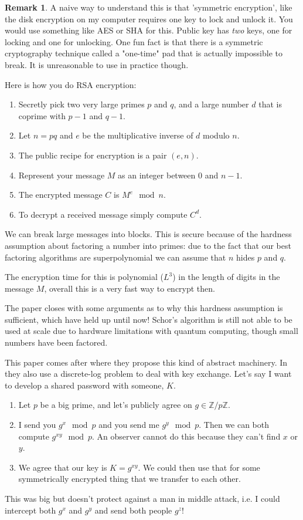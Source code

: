 \documentclass{amsart}
\theoremstyle{definition}
\newtheorem{remark}[theorem]{Remark}
\begin{document}
\begin{remark}

A naive way to understand this is that 'symmetric encryption', like the disk encryption on my computer requires one key to lock and unlock it. You would use something like AES or SHA for this. Public key has \textit{two} keys, one for locking and one for unlocking. One fun fact is that there is a symmetric cryptography technique called a "one-time" pad that is actually impossible to break. It is unreasonable to use in practice though.
    
\end{remark}
Here is how you do RSA encryption:
\begin{enumerate}
    \item Secretly pick two very large primes $p$ and $q$, and a large number $d$ that is coprime with $p-1$ and $q-1$. 
    \item Let $n=pq$ and $e$ be the multiplicative inverse of $d$ modulo $n$.
    \item The public recipe for encryption is a pair $(e,n)$.
    \item Represent your message $M$ as an integer between $0$ and $n-1$.
    \item The encrypted message $C$ is $M^e \mod n$.
    \item To decrypt a received message simply compute $C^d$.
\end{enumerate}
We can break large messages into blocks. This is secure because of the hardness assumption about factoring a number into primes: due to the fact that our best factoring algorithms are superpolynomial we can assume that $n$ hides $p$ and $q$.

The encryption time for this is polynomial ($L^3$) in the length of digits in the message $M$, overall this is a very fast way to encrypt then.

The paper closes with some arguments as to why this hardness assumption is sufficient, which have held up until now! Schor's algorithm is still not able to be used at scale due to hardware limitations with quantum computing, though small numbers have been factored.

This paper comes after \cite{DH} where they propose this kind of abstract machinery. In \cite{DH} they also use a discrete-log problem to deal with key exchange. Let's say I want to develop a shared password with someone, $K$.
\begin{enumerate}
    \item Let $p$ be a big prime, and let's publicly agree on $g\in \mathbb{Z}/p\mathbb{Z}$.
    \item I send you $g^x\mod p$ and you send me $g^y \mod p$. Then we can both compute $g^{xy} \mod p$. An observer cannot do this because they can't find $x$ or $y$.
    \item We agree that our key is $K=g^{xy}$. We could then use that for some symmetrically encrypted thing that we transfer to each other.
\end{enumerate}
This was big but doesn't protect against a man in middle attack, i.e. I could intercept both $g^x$ and $g^y$ and send both people $g^z$!
\end{document}
